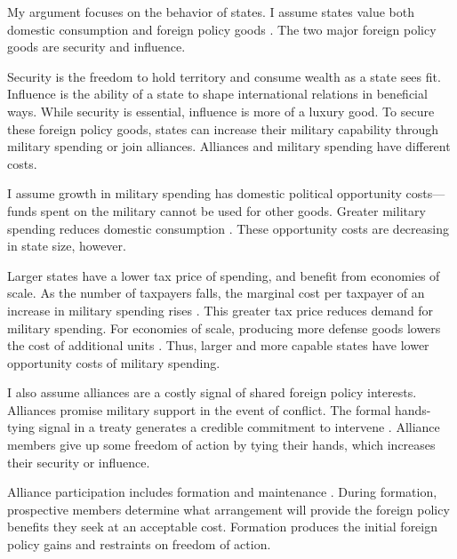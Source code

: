 \documentclass[12pt]{article}
\begin{document}
My argument focuses on the behavior of states. 
I assume states value both domestic consumption and foreign policy goods \citep{Powell1993, Fearon2018}. 
The two major foreign policy goods are security and influence. 


Security is the freedom to hold territory and consume wealth as a state sees fit. 
Influence is the ability of a state to shape international relations in beneficial ways. 
While security is essential, influence is more of a luxury good. 
To secure these foreign policy goods, states can increase their military capability through military spending or join alliances. 
Alliances and military spending have different costs. 


I assume growth in military spending has domestic political opportunity costs--- funds spent on the military cannot be used for other goods. 
Greater military spending reduces domestic consumption \citep{Fearon2018}. 
These opportunity costs are decreasing in state size, however. 


Larger states have a lower tax price of spending, and benefit from economies of scale. 
As the number of taxpayers falls, the marginal cost per taxpayer of an increase in military spending rises \citep{DudleyMontmarquette1981}. 
This greater tax price reduces demand for military spending. 
For economies of scale, producing more defense goods lowers the cost of additional units \citep{Moravcsik1991, AlesinaSpolaore2006}. 
Thus, larger and more capable states have lower opportunity costs of military spending. 


I also assume alliances are a costly signal of shared foreign policy interests. 
Alliances promise military support in the event of conflict. 
The formal hands-tying signal in a treaty generates a credible commitment to intervene \citep{Fearon1997, Leeds2003}.
Alliance members give up some freedom of action by tying their hands, which increases their security or influence. 


Alliance participation includes formation and maintenance \citep{Snyder1997}. 
During formation, prospective members determine what arrangement will provide the foreign policy benefits they seek at an acceptable cost. 
Formation produces the initial foreign policy gains and restraints on freedom of action. 
\end{document}

